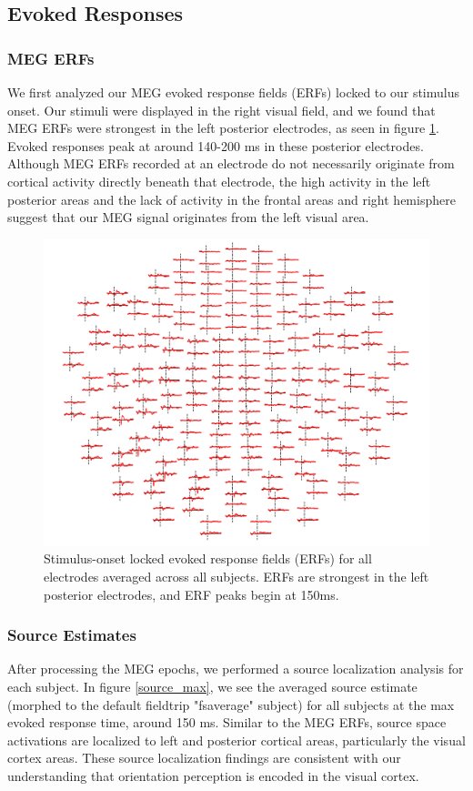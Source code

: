\documentclass[../main.tex]{subfiles}
\begin{document}
\subsection{Evoked Responses}
\subsubsection{MEG ERFs}
We first analyzed our MEG evoked response fields (ERFs) locked to our stimulus onset. Our stimuli were displayed in the right visual field, and we found that MEG ERFs were strongest in the left posterior electrodes, as seen in figure \ref{erfs}. Evoked responses peak at around 140-200 ms in these posterior electrodes. Although MEG ERFs recorded at an electrode do not necessarily originate from cortical activity directly beneath that electrode, the high activity in the left posterior areas and the lack of activity in the frontal areas and right hemisphere suggest that our MEG signal originates from the left visual area.

\begin{figure}
    \centering
    \includegraphics[scale=0.99]{figures/results/all_erf.png}
    \caption{Stimulus-onset locked evoked response fields (ERFs) for all electrodes averaged across all subjects. ERFs are strongest in the left posterior electrodes, and ERF peaks begin at 150ms.}
    \label{erfs}
\end{figure}


\subsubsection{Source Estimates}
After processing the MEG epochs, we performed a source localization analysis for each subject. In figure \ref{source_max}, we see the averaged source estimate (morphed to the default fieldtrip "fsaverage" subject) for all subjects at the max evoked response time, around 150 ms. Similar to the MEG ERFs, source space activations are localized to left and posterior cortical areas, particularly the visual cortex areas. These source localization findings are consistent with our understanding that orientation perception is encoded in the visual cortex.
\end{document}
